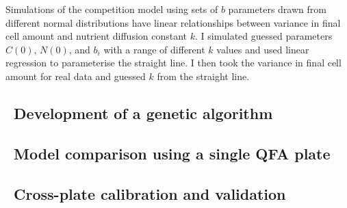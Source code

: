 Simulations of the competition model using sets of \(b\) parameters
drawn from different normal distributions have linear relationships
between variance in final cell amount and nutrient diffusion constant
\(k\). I simulated guessed parameters \(C(0)\), \(N(0)\), and
\(b_{i}\) with a range of different \(k\) values and used linear
regression to parameterise the straight line. I then took the variance
in final cell amount for real data and guessed \(k\) from the
straight line.

\subsection{\thesubsection~Development of a genetic algorithm}


\subsection{\thesubsection~Model comparison using a single QFA plate}

\subsection{\thesubsection~Cross-plate calibration and validation}
%


